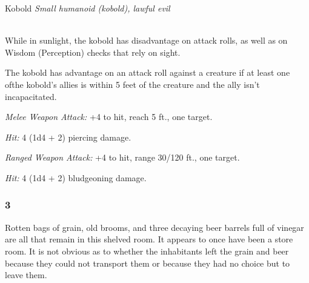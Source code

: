 \documentclass[palace_of_the_silver_princess]{subfiles}
\begin{document}
\begin{monsterbox}{Kobold}
    \textit{Small humanoid (kobold), lawful evil}\\
    \hline
    \basics[%
        armorclass = 12,
        hitpoints  = 5 (2d6 - 2),
        speed      = 30 ft.
    ]
    \hline
    \stats[
        STR = \stat{7},
        DEX = \stat{15},
        CON = \stat{9},
        INT = \stat{8},
        WIS = \stat{7},
        CHA = \stat{8}
    ]
    \hline
    \details[
        senses = {darkvision 60 ft., passive Perception 8},
        languages = {Common, Draconic},
        challenge = {1/8 (25 XP)},
    ]
    \hline
    \\[1mm]
    \begin{monsteraction}
        While in sunlight, the kobold has disadvantage on attack rolls,
        as well as on Wisdom (Perception) checks that rely on sight.
    \end{monsteraction}

    \begin{monsteraction}
        The kobold has advantage on an attack roll against a creature
        if at least one ofthe kobold's allies is within 5 feet of the
        creature and the ally isn't incapacitated.
    \end{monsteraction}
     \begin{monsteraction}[Dagger]
         \textit{Melee Weapon Attack:} +4 to hit, reach 5 ft., one target.

         \textit{Hit:} 4 (1d4 + 2) piercing damage.
     \end{monsteraction}

     \begin{monsteraction}[Sling]
         \textit{Ranged Weapon Attack:} +4 to hit, range 30/120 ft.,
         one target. 

         \textit{Hit:} 4 (1d4 + 2) bludgeoning damage.
     \end{monsteraction}
\end{monsterbox}

\subsubsection{3}

\begin{quotebox}
    Rotten bags of grain, old brooms, and three decaying beer barrels
    full of vinegar are all that remain in this shelved room. It appears
    to once have been a store room. It is not obvious as to whether the
    inhabitants left the grain and beer because they could not transport
    them or because they had no choice but to leave them.
\end{quotebox}
\end{document}
